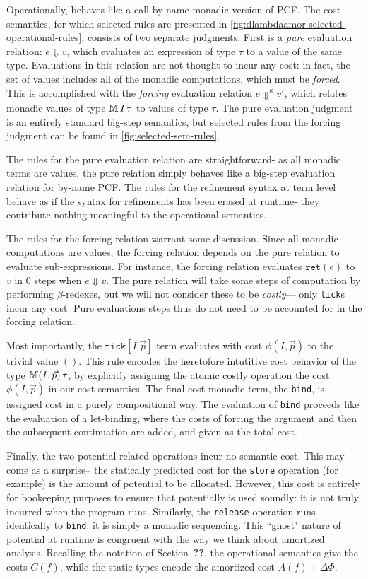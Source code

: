 Operationally, \dlambdaamor behaves like a call-by-name monadic version of PCF. The cost semantics, for which selected rules are presented in \autoref{fig:dlambdaamor-selected-operational-rules}, consists of two separate judgments. First is a \textit{pure} evaluation relation: $e \Downarrow v$, which evaluates an expression of type $\tau$ to a value of the same type. Evaluations in this relation are not thought to incur any cost: in fact, the set of values includes all of the monadic computations, which must be \textit{forced}. This is accomplished with the \textit{forcing} evaluation relation $e \Downarrow^\kappa v'$, which relates monadic values of type $\mathbb{M} \, I \, \tau$ to values of type $\tau$. The pure evaluation judgment is an entirely standard big-step semantics, but selected rules from the forcing judgment can be found in \autoref{fig:selected-sem-rules}.

The rules for the pure evaluation relation are straightforward- as all monadic terms are values, the pure relation simply behaves like a big-step evaluation relation for by-name PCF. The rules for the refinement syntax at term level behave as if the syntax for refinements has been erased at runtime- they contribute nothing meaningful to the operational semantics.

The rules for the forcing relation warrant some discussion. Since all monadic computations are values, the forcing relation depends on the pure relation to evaluate sub-expressions. For instance, the forcing relation evaluates $\texttt{ret}(e)$ to $v$ in $0$ steps when $e \Downarrow v$. The pure relation will take some steps of computation by performing $\beta$-redexes, but we will not consider these to be \textit{costly}--- only \texttt{tick}s incur any cost. Pure evaluations steps thus do not need to be accounted for in the forcing relation.

Most importantly, the $\texttt{tick}[I|\vec{p}]$ term evaluates with cost $\phi(I,\vec{p})$ to the trivial value $()$. This rule encodes the heretofore intutitive cost behavior of the type $\mathbb{M} (I,\vec{p}) \, \tau$, by explicitly assigning the atomic costly operation the cost $\phi(I,\vec{p})$ in our cost semantics.  The final cost-monadic term, the \texttt{bind}, is assigned cost in a purely compositional way. The evaluation of \texttt{bind} proceeds like the evaluation of a let-binding, where the costs of forcing the argument and then the subsequent continuation are added, and given as the total cost.

Finally, the two potential-related operations incur no semantic cost. This may come as a surprise-- the statically predicted cost for the \texttt{store} operation (for example) is the amount of potential to be allocated. However, this cost is entirely for bookeeping purposes to ensure that potentially is used soundly: it is not truly incurred when the program runs. Similarly, the \texttt{release} operation runs identically to \texttt{bind}: it is simply a monadic sequencing. This ``ghost" nature of potential at runtime is congruent with the way we think about amortized analysis. Recalling the notation of Section~\textbf{??}, the operational semantics give the costs $C(f)$, while the static types encode the amortized cost $A(f) + \Delta\Phi$.


